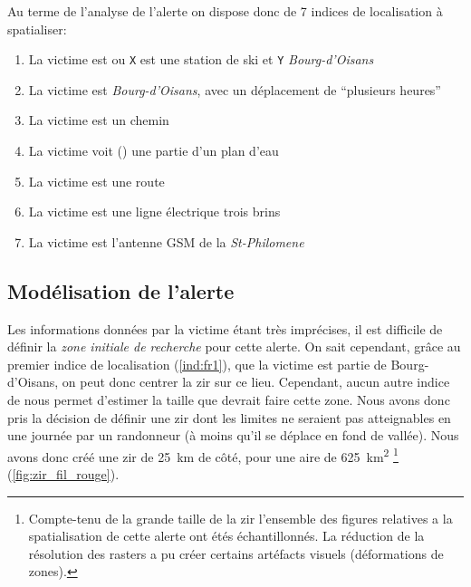 Au terme de l'analyse de l'alerte on dispose donc de 7 indices de
localisation à spatialiser:
% 
\begin{enumerate}
\item \label{ind:fr1} La victime est
   ou \texttt{X} est
  une station de ski et \texttt{Y} \emph{Bourg-d'Oisans}
\item \label{ind:fr2} La victime est
   \emph{Bourg-d'Oisans}, avec un
  déplacement de \enquote{plusieurs heures}
\item \label{ind:fr3} La victime est  un
  chemin
\item \label{ind:fr4} La victime voit ()
  une partie d'un plan d'eau
\item \label{ind:fr5} La victime est  une
  route
\item \label{ind:fr6} La victime est  une
  ligne électrique trois brins
\item \label{ind:fr7} La victime est 
  l'antenne GSM de la \emph{St-Philomene}
\end{enumerate}

\subsection{Modélisation de l'alerte}
\label{subsec:9-4-2}

Les informations données par la victime étant très imprécises, il est
difficile de définir la \emph{zone initiale de recherche} pour cette
alerte. On sait cependant, grâce au premier indice de localisation
(\ref{ind:fr1}), que la victime est partie de Bourg-d'Oisans, on peut
donc centrer la \ac{zir} sur ce lieu. Cependant, aucun autre indice de
nous permet d'estimer la taille que devrait faire cette zone. Nous
avons donc pris la décision de définir une \ac{zir} dont les limites
ne seraient pas atteignables en une journée par un randonneur (à moins
qu'il se déplace en fond de vallée).
%
Nous avons donc créé une \ac{zir} de \SI{25}{\kilo\meter} de côté,
pour une aire de \SI{625}{\kilo\meter\squared} \footnote{Compte-tenu
  de la grande taille de la \ac{zir} l'ensemble des figures relatives
  a la spatialisation de cette alerte ont étés échantillonnés. La
  réduction de la résolution des rasters a pu créer certains artéfacts
visuels (\eg déformations de zones).}
(\autoref{fig:zir_fil_rouge}).

